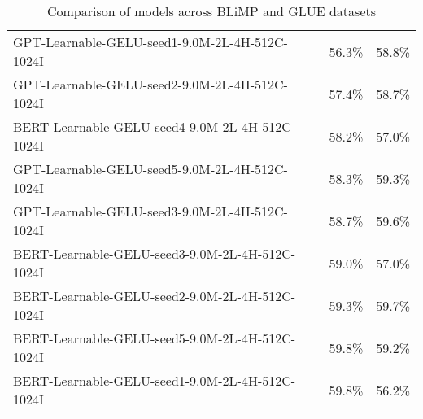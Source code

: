 \begin{table*}[h]
\begin{tabular}{lcc}
    GPT-Learnable-GELU-seed1-9.0M-2L-4H-512C-1024I & 56.3\% & 58.8\% \\
    GPT-Learnable-GELU-seed2-9.0M-2L-4H-512C-1024I & 57.4\% & 58.7\% \\
    BERT-Learnable-GELU-seed4-9.0M-2L-4H-512C-1024I & 58.2\% & 57.0\% \\
    GPT-Learnable-GELU-seed5-9.0M-2L-4H-512C-1024I & 58.3\% & 59.3\% \\
    GPT-Learnable-GELU-seed3-9.0M-2L-4H-512C-1024I & 58.7\% & 59.6\% \\
    BERT-Learnable-GELU-seed3-9.0M-2L-4H-512C-1024I & 59.0\% & 57.0\% \\
    BERT-Learnable-GELU-seed2-9.0M-2L-4H-512C-1024I & 59.3\% & 59.7\% \\
    BERT-Learnable-GELU-seed5-9.0M-2L-4H-512C-1024I & 59.8\% & 59.2\%\\
    BERT-Learnable-GELU-seed1-9.0M-2L-4H-512C-1024I & 59.8\% & 56.2\%\\
    \hline
    \end{tabular}
    \caption{Comparison of models across BLiMP and GLUE datasets}
    \label{tab:comparison}
    \end{table*}

